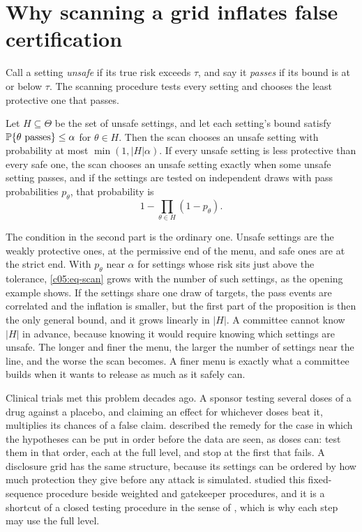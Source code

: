 \section{Why scanning a grid inflates false certification}

Call a setting \emph{unsafe} if its true risk exceeds $\tau$, and say it \emph{passes} if
its bound is at or below $\tau$. The scanning procedure tests every setting and chooses
the least protective one that passes.

\begin{proposition}\label{c05:prop-scan}
Let $H \subseteq \Theta$ be the set of unsafe settings, and let each setting's bound
satisfy $\mathbb{P}\{\theta \text{ passes}\} \le \alpha$ for $\theta \in H$. Then the scan
chooses an unsafe setting with probability at most $\min(1, |H|\alpha)$. If every unsafe
setting is less protective than every safe one, the scan chooses an unsafe setting
exactly when some unsafe setting passes, and if the settings are tested on independent
draws with pass probabilities $p_\theta$, that probability is
\begin{equation}\label{c05:eq-scan}
1 - \prod_{\theta \in H}(1 - p_\theta).
\end{equation}
\end{proposition}

The condition in the second part is the ordinary one. Unsafe settings are the weakly
protective ones, at the permissive end of the menu, and safe ones are at the strict end.
With $p_\theta$ near $\alpha$ for settings whose risk sits just above the tolerance,
\eqref{c05:eq-scan} grows with the number of such settings, as the opening example shows.
If the settings share one draw of targets, the pass events are correlated and the
inflation is smaller, but the first part of the proposition is then the only general
bound, and it grows linearly in $|H|$. A committee cannot know $|H|$ in advance, because
knowing it would require knowing which settings are unsafe. The longer and finer the
menu, the larger the number of settings near the line, and the worse the scan becomes.
A finer menu is exactly what a committee builds when it wants to release as much as it
safely can.

Clinical trials met this problem decades ago. A sponsor testing several doses of a drug
against a placebo, and claiming an effect for whichever doses beat it, multiplies its
chances of a false claim. \citet{maurer1995} described the remedy for the case in which
the hypotheses can be put in order before the data are seen, as doses can: test them in
that order, each at the full level, and stop at the first that fails. A disclosure grid
has the same structure, because its settings can be ordered by how much protection they
give before any attack is simulated. \citet{westfall2001} studied this fixed-sequence
procedure beside weighted and gatekeeper procedures, and it is a shortcut of a closed
testing procedure in the sense of \citet{marcus1976}, which is why each step may use the
full level.

